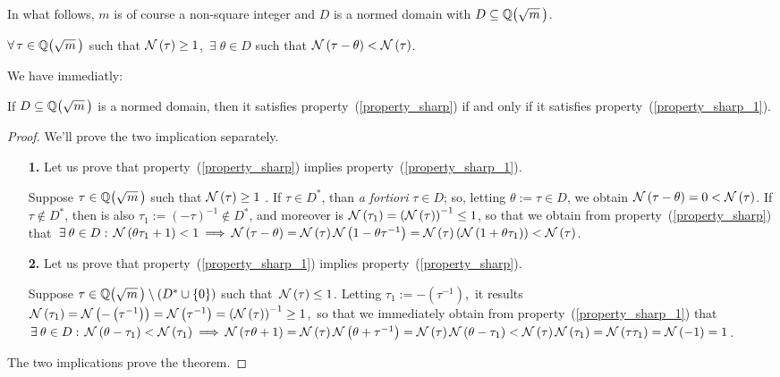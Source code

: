 \medskip
In what follows, $m$ is of course a non-square integer
and $D$ is a normed domain with $D \subseteq \QQ{m}$.

\medskip
\begin{property}\label{property_sharp_1}
$\forall\, \tau \in \QQ{m}$ such that\/ $\mathcal{N}\left(\tau\right) \geq 1$,
$\, \exists\; \theta \in D$\/ such that\/
$\mathcal{N}\left(\tau - \theta\right) < \mathcal{N}\left(\tau\right)$.
\end{property}

We have immediatly:

\begin{thm}\label{sharp1_equivalent_sharp}
If $D \subseteq \QQ{m}$ is a normed domain, then it satisfies
property~(\ref{property_sharp}) if and only if it satisfies
property~(\ref{property_sharp_1}).
\end{thm}

\begin{proof}
%
We'll prove the two implication separately.

\begin{enumerate}

\item[\textbf{1.}]
Let us prove that property~(\ref{property_sharp})
implies property~(\ref{property_sharp_1}).

Suppose $\tau \in \QQ{m}$ such that
$\mathcal{N}\left(\tau\right) \geq 1$ . If $\tau \in D^{\ast}$, than
\textit{a fortiori} $\tau \in D$; so, letting
$\theta:= \tau \in D$, we obtain
$\mathcal{N}\left(\tau - \theta\right) = 0 < \mathcal{N}\left(\tau\right)$.
If $\tau \notin D^{\ast}$, then is also
$\tau_1:= \left(-\tau\right)^{-1} \notin D^{\ast}$,
and moreover is $\mathcal{N}\left(\tau_1\right) =
\left(\mathcal{N}\left(\tau\right)\right)^{-1} \leq 1$,
so that we obtain from property~(\ref{property_sharp})
that \,$\exists\: \theta \in D:\,
\mathcal{N}\left(\theta\tau_1 + 1\right) < 1 \:\Longrightarrow\: \mathcal{N}\left(\tau - \theta\right)
= \mathcal{N}\left(\tau\right)\mathcal{N}\left(1 -\theta\tau^{-1}\right) = 
\mathcal{N}\left(\tau\right)\left(\mathcal{N}\left(1 +\theta\tau_1\right)\right)
< \mathcal{N}\left(\tau\right)$.

\item[\textbf{2.}]
Let us prove that property~(\ref{property_sharp_1})
implies property~(\ref{property_sharp}).

Suppose $\tau \in \QQ{m} \setminus \left(D^\ast \cup \{0\}\right)$
such that\, $\mathcal{N}\left(\tau\right) \leq 1$. Letting
$\tau_1:= -\left(\tau^{-1}\right)$,\, it results\,
$\mathcal{N}\left(\tau_1\right) = \mathcal{N}\left(-\left(\tau^{-1}\right)\right)
= \mathcal{N}\left(\tau^{-1}\right) = \left(\mathcal{N}\left(\tau\right)\right)^{-1}\geq 1$,
\,so that we immediately obtain from
property~(\ref{property_sharp_1}) that\,
$\exists\: \theta \in D:\, \mathcal{N}\left(\theta - \tau_1\right) <
\mathcal{N}\left(\tau_1\right) \:\Longrightarrow\: \mathcal{N}\left(\tau\theta + 1\right) =
\mathcal{N}\left(\tau\right) \mathcal{N}\left(\theta +\tau^{-1}\right)
= \mathcal{N}\left(\tau\right) \mathcal{N}\left(\theta - \tau_1\right) <
\mathcal{N}\left(\tau\right)\mathcal{N}\left(\tau_1\right) = \mathcal{N}\left(\tau \tau_1\right)
=\mathcal{N}\left(-1\right) = 1$.

\end{enumerate}
The two implications prove the theorem.
%
\end{proof}

